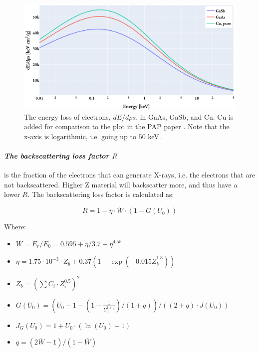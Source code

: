 \begin{figure}[htbp]
    \centering
    \includegraphics[width=0.8\linewidth]{figures/PAP_energy_loss_dE_drhos.pdf}
    \caption{
        The energy loss of electrons, $dE/d\rho s$,  in GaAs, GaSb, and Cu.
        Cu is added for comparison to the plot in the PAP paper \cite[Fig. 4]{pap_1991}.
        Note that the x-axis is logarithmic, i.e. going up to $50$ keV.
    }
    \label{fig:PAP:energy_loss_electrons_dE_drhos}
\end{figure}





\paragraph*{\emph{The backscattering loss factor $R$}} is the fraction of the electrons that can generate X-rays, i.e. the electrons that are not backscattered.
Higher Z material will backscatter more, and thus have a lower $R$.
The backscattering loss factor is calculated as:

\begin{equation}
    R = 1 - \bar{\eta}  \cdot \bar{W} \cdot (1-G(U_0))
\end{equation}

Where:

\begin{itemize}
    \item  $\bar{W} = \bar{E}_r/E_0 = 0.595 + \bar{\eta}/3.7 + \bar{\eta}^{4.55} $
    \item  $\bar{\eta} = 1.75 \cdot 10^{-3} \cdot \bar{Z}_b + 0.37(1-\exp(-0.015\bar{Z}_b^{1.3})) $
    \item  $\bar{Z}_b = (\sum C_i \cdot Z_i^{0.5})^2$
    \item  $G(U_0) = (U_0 - 1 - (1- \frac{1}{U_0^{1+q}})/(1+q)) / ((2+q)\cdot J(U_0))$
    \item  $J_G(U_0) = 1 + U_0 \cdot (\ln(U_0)-1) $
    \item  $q = (2 \bar{W} - 1) / (1 - \bar{W}) $
\end{itemize}


